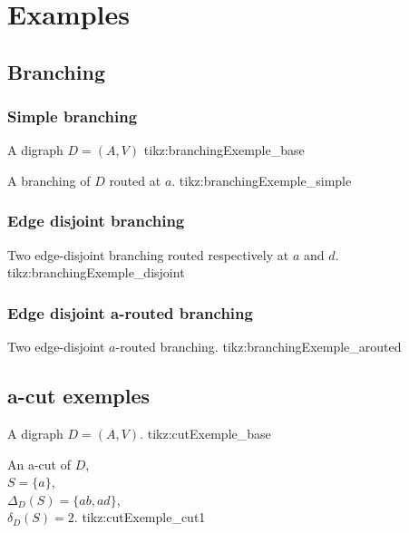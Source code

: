 \documentclass{article}
\begin{document}
\section{Examples}

\subsection{Branching}

\subsubsection{Simple branching}
\begin{minipage}{.5\textwidth}
\centering
{}
{A digraph $D=(A, V)$}
{tikz:branchingExemple_base}
\end{minipage}%
\begin{minipage}{.5\textwidth}
\centering
{}
{A branching of $D$ routed at $a$.}
{tikz:branchingExemple_simple}
\end{minipage}


\subsubsection{Edge disjoint branching}

{Two edge-disjoint branching routed respectively at $a$ and $d$.}
{tikz:branchingExemple_disjoint}

\subsubsection{Edge disjoint a-routed branching}

{Two edge-disjoint $a$-routed branching.}
{tikz:branchingExemple_arouted}

\subsection{a-cut exemples}

{A digraph $D=(A, V)$.}
{tikz:cutExemple_base}

{An a-cut of $D$,\\ $S = \{a\}$,\\ $\Delta_D(S)=\{ab, ad\}$,\\ $\delta_D(S) = 2$.}
{tikz:cutExemple_cut1}
\end{document}
